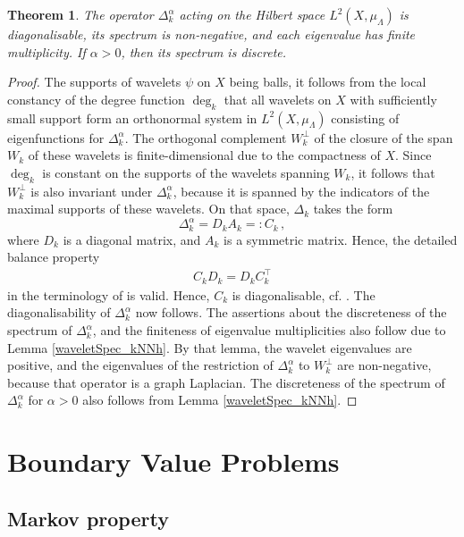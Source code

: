\documentclass[a4paper,draft]{ZbRad}
\theoremstyle{plain}
\newtheorem{thm}{Theorem}[section]
\theoremstyle{definition}
\numberwithin{equation}{section}
\begin{document}
\begin{thm}\label{kNNh_Spectrum}
The operator $\Delta^\alpha_k$ acting on the Hilbert space $L^2(X,\mu_\Lambda)$ is
diagonalisable, its spectrum is 
non-negative, and each eigenvalue has finite multiplicity. If $\alpha>0$, then its spectrum is discrete.
\end{thm}

\begin{proof}
The supports of wavelets $\psi$ on $X$ being balls, it follows from  the local constancy of the degree function $\deg_k$  that
all wavelets on $X$ with sufficiently small support form an orthonormal system in 
$L^2(X,\mu_\Lambda)$ consisting of
eigenfunctions for $\Delta_k^\alpha$. The orthogonal complement $W_k^\perp$ of the closure of
the span $W_k$ of these wavelets is finite-dimensional due to the compactness of $X$.
Since $\deg_k$ is constant on the supports of the wavelets spanning $W_k$, it follows that $W_k^\perp$ is also invariant under $\Delta_k^\alpha$, because it is spanned by the indicators of the maximal supports of these wavelets. On that space, $\Delta_k$ takes the form
\[
\Delta^\alpha_k= D_kA_k 
=: C_k\,,
\]
where $D_k$ is a diagonal matrix, and $A_k$ is a symmetric matrix. Hence, the
detailed balance property
\begin{align*}
C_k D_k = D_k C_k^\top
\end{align*}
in the terminology of 
\cite[(4.2)]{vanKampen2007} is valid. Hence, $C_k$ is diagonalisable, cf.
\cite[Chapter 7]{vanKampen2007}. The diagonalisability of $\Delta^\alpha_k$ now follows. The assertions
about the discreteness of the spectrum of $\Delta_k^\alpha$, and the finiteness of eigenvalue
multiplicities also follow due to Lemma \ref{waveletSpec_kNNh}. By that lemma, the wavelet eigenvalues are
positive, and the eigenvalues of the restriction of $\Delta_k^\alpha$ to $W_k^\perp$
are non-negative, because that operator is a graph Laplacian. The discreteness of the spectrum of $\Delta_k^\alpha$ for $\alpha>0$ also follows from Lemma \ref{waveletSpec_kNNh}.
\end{proof}


\section{Boundary Value Problems}

\subsection{Markov property}
\end{document}
